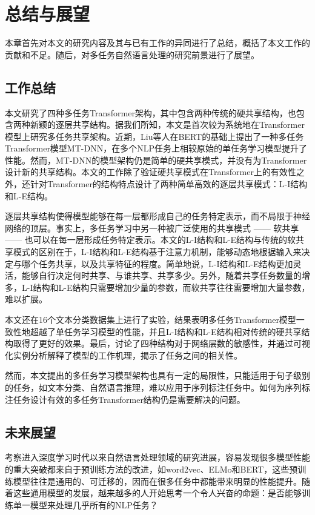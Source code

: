 \chapter{总结与展望}
\label{cha:conclusions}
本章首先对本文的研究内容及其与已有工作的异同进行了总结，概括了本文工作的贡献和不足。随后，对多任务自然语言处理的研究前景进行了展望。

\section{工作总结}
本文研究了四种多任务Transformer架构，其中包含两种传统的硬共享结构，也包含两种新颖的逐层共享结构。据我们所知，本文是首次较为系统地在Transformer模型上研究多任务共享架构。近期，Liu等人\cite{liu2019multi}在BERT\cite{devlin2018bert}的基础上提出了一种多任务Transformer模型MT-DNN，在多个NLP任务上相较原始的单任务学习模型提升了性能。然而，MT-DNN的模型架构仍是简单的硬共享模式，并没有为Transformer设计新的共享结构。本文的工作除了验证硬共享模式在Transformer上的有效性之外，还针对Transformer的结构特点设计了两种简单高效的逐层共享模式：L-I结构和L-E结构。

逐层共享结构使得模型能够在每一层都形成自己的任务特定表示，而不局限于神经网络的顶层。事实上，多任务学习中另一种被广泛使用的共享模式 —— 软共享 —— 也可以在每一层形成任务特定表示。本文的L-I结构和L-E结构与传统的软共享模式的区别在于，L-I结构和L-E结构基于注意力机制，能够动态地根据输入来决定与哪个任务共享，以及共享特征的程度。简单地说，L-I结构和L-E结构更加灵活，能够自行决定何时共享、与谁共享、共享多少。另外，随着共享任务数量的增多，L-I结构和L-E结构只需要增加少量的参数，而软共享往往需要增加大量参数，难以扩展。

本文还在16个文本分类数据集上进行了实验，结果表明多任务Transformer模型一致性地超越了单任务学习模型的性能，并且L-I结构和L-E结构相对传统的硬共享结构取得了更好的效果。最后，讨论了四种结构对于网络层数的敏感性，并通过可视化实例分析解释了模型的工作机理，揭示了任务之间的相关性。

然而，本文提出的多任务学习模型架构也具有一定的局限性，只能适用于句子级别的任务，如文本分类、自然语言推理，难以应用于序列标注任务中。如何为序列标注任务设计有效的多任务Transformer结构仍是需要解决的问题。

\section{未来展望}
考察进入深度学习时代以来自然语言处理领域的研究进展，容易发现很多模型性能的重大突破都来自于预训练方法的改进，如word2vec\cite{DBLP:conf/nips/MikolovSCCD13}、ELMo\cite{DBLP:conf/naacl/PetersNIGCLZ18}和BERT\cite{devlin2018bert}，这些预训练模型往往是通用的、可迁移的，因而在很多任务中都能带来明显的性能提升。随着这些通用模型的发展，越来越多的人开始思考一个令人兴奋的命题：是否能够训练单一模型来处理几乎所有的NLP任务？

